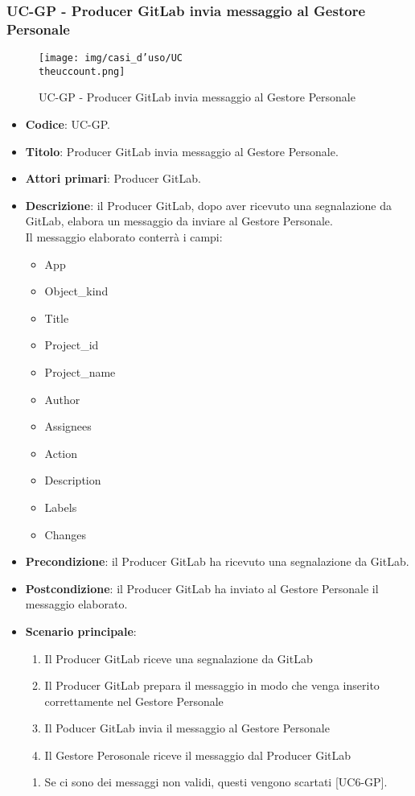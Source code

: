 \subsubsection{UC\theuccount-GP - Producer GitLab invia messaggio al Gestore Personale}
	\begin{figure}[H]
		\centering
		\texttt{[image: img/casi\_d'uso/UC\\theuccount.png]}\\
		\caption{UC\theuccount-GP - Producer GitLab invia messaggio al Gestore Personale}
	\end{figure}
	\begin{itemize}
		\item \textbf{Codice}: UC\theuccount-GP.
		\item \textbf{Titolo}: Producer GitLab invia messaggio al Gestore Personale.
		\item \textbf{Attori primari}: Producer GitLab.
		\item \textbf{Descrizione}: il Producer GitLab, dopo aver ricevuto una segnalazione da GitLab, elabora un messaggio da inviare al Gestore Personale. \\ Il messaggio elaborato conterrà i campi:
		\begin{itemize}
			\item App
			\item Object\_kind
			\item Title
			\item Project\_id
			\item Project\_name
			\item Author
			\item Assignees
			\item Action
			\item Description
			\item Labels
			\item Changes
		\end{itemize}
		\item \textbf{Precondizione}: il Producer GitLab ha ricevuto una segnalazione da GitLab.
		\item \textbf{Postcondizione}: il Producer GitLab ha inviato al Gestore Personale il messaggio  \newline elaborato.
		\item \textbf{Scenario principale}:
		\begin{enumerate}
			\item Il Producer GitLab riceve una segnalazione da GitLab
			\item Il Producer GitLab prepara il messaggio in modo che venga inserito correttamente nel Gestore Personale
			\item Il Poducer GitLab invia il messaggio al Gestore Personale
            \item Il Gestore Perosonale riceve il messaggio dal Producer GitLab
		\end{enumerate}
        \begin{enumerate}
            \item Se ci sono dei messaggi non validi, questi vengono scartati [UC6-GP].
        \end{enumerate}
	\end{itemize}


